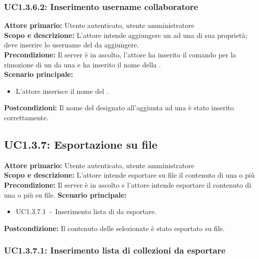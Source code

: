 \documentclass{scalatekids-article}
\begin{document}
\subsubsection{UC1.3.6.2: Inserimento username collaboratore}

\textbf{Attore primario:} Utente autenticato, utente amministratore\\
\textbf{Scopo e descrizione:} L'attore intende aggiungere un  ad una  di sua proprietà; deve inserire lo username del  da aggiungere.\\
\textbf{Precondizione:} Il server è in ascolto, l'attore ha inserito il comando per la rimozione di un  da una  e ha inserito il nome della .\\
\textbf{Scenario principale:}
\begin{itemize}
\item L'attore inserisce il nome del .
\end{itemize}
\textbf{Postcondizioni:} Il nome del  designato all'aggiunta ad una  è stato inserito correttamente.

\subsection{UC1.3.7: Esportazione su file}

\textbf{Attore primario:} Utente autenticato, utente amministratore\\
\textbf{Scopo e descrizione:} L'attore intende esportare su file il contenuto di una o più \\
\textbf{Precondizione:} Il server è in ascolto e l'attore intende esportare il contenuto di una o più  su file.
\textbf{Scenario principale:}
\begin{itemize}
\item UC1.3.7.1\ -\ Inserimento lista di  da esportare. %
\end{itemize}
\textbf{Postcondizione:} Il contenuto delle  selezionate è stato esportato su file.

\subsubsection{UC1.3.7.1: Inserimento lista di collezioni da esportare}
\end{document}
